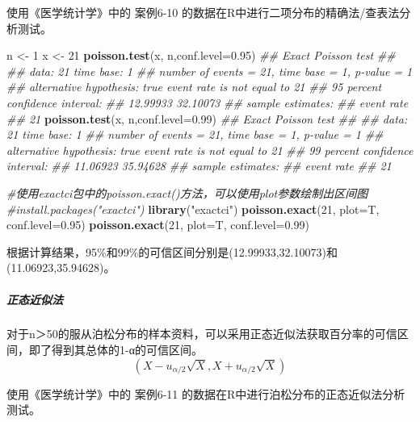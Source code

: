 \documentclass[
]{article}
\newenvironment{Shaded}{\begin{snugshade}}{\end{snugshade}}
\newcommand{\CommentTok}[1]{\textcolor[rgb]{0.56,0.35,0.01}{\textit{#1}}}
\newcommand{\DataTypeTok}[1]{\textcolor[rgb]{0.13,0.29,0.53}{#1}}
\newcommand{\DecValTok}[1]{\textcolor[rgb]{0.00,0.00,0.81}{#1}}
\newcommand{\FloatTok}[1]{\textcolor[rgb]{0.00,0.00,0.81}{#1}}
\newcommand{\KeywordTok}[1]{\textcolor[rgb]{0.13,0.29,0.53}{\textbf{#1}}}
\newcommand{\NormalTok}[1]{#1}
\newcommand{\StringTok}[1]{\textcolor[rgb]{0.31,0.60,0.02}{#1}}
\begin{document}
使用《医学统计学》中的 案例6-10 的数据在R中进行二项分布的精确法/查表法分析测试。

\begin{Shaded}
\begin{Highlighting}[]
\NormalTok{n <-}\StringTok{ }\DecValTok{1}
\NormalTok{x <-}\StringTok{ }\DecValTok{21}
\KeywordTok{poisson.test}\NormalTok{(x, n,}\DataTypeTok{conf.level=}\FloatTok{0.95}\NormalTok{)}
\CommentTok{##  Exact Poisson test}
\CommentTok{## }
\CommentTok{## data:  21 time base: 1}
\CommentTok{## number of events = 21, time base = 1, p-value = 1}
\CommentTok{## alternative hypothesis: true event rate is not equal to 21}
\CommentTok{## 95 percent confidence interval:}
\CommentTok{##  12.99933 32.10073}
\CommentTok{## sample estimates:}
\CommentTok{## event rate }
\CommentTok{##         21 }
\KeywordTok{poisson.test}\NormalTok{(x, n,}\DataTypeTok{conf.level=}\FloatTok{0.99}\NormalTok{)}
\CommentTok{##  Exact Poisson test}
\CommentTok{## }
\CommentTok{## data:  21 time base: 1}
\CommentTok{## number of events = 21, time base = 1, p-value = 1}
\CommentTok{## alternative hypothesis: true event rate is not equal to 21}
\CommentTok{## 99 percent confidence interval:}
\CommentTok{##  11.06923 35.94628}
\CommentTok{## sample estimates:}
\CommentTok{## event rate }
\CommentTok{##         21 }

\CommentTok{#使用exactci包中的poisson.exact()方法，可以使用plot参数绘制出区间图}
\CommentTok{#install.packages("exactci")}
\KeywordTok{library}\NormalTok{(}\StringTok{"exactci"}\NormalTok{)}
\KeywordTok{poisson.exact}\NormalTok{(}\DecValTok{21}\NormalTok{, }\DataTypeTok{plot=}\NormalTok{T, }\DataTypeTok{conf.level=}\FloatTok{0.95}\NormalTok{)}
\KeywordTok{poisson.exact}\NormalTok{(}\DecValTok{21}\NormalTok{, }\DataTypeTok{plot=}\NormalTok{T, }\DataTypeTok{conf.level=}\FloatTok{0.99}\NormalTok{)}
\end{Highlighting}
\end{Shaded}

根据计算结果，95\%和99\%的可信区间分别是(12.99933,32.10073)和(11.06923,35.94628)。

\hypertarget{ux6b63ux6001ux8fd1ux4f3cux6cd5-2}{%
\subparagraph{正态近似法}\label{ux6b63ux6001ux8fd1ux4f3cux6cd5-2}}

对于n＞50的服从泊松分布的样本资料，可以采用正态近似法获取百分率的可信区间，即了得到其总体的1-α的可信区间。
\[(X-u_{\alpha/2}\sqrt{X},X+u_{\alpha/2}\sqrt{X})\]

使用《医学统计学》中的 案例6-11 的数据在R中进行泊松分布的正态近似法分析测试。
\end{document}
